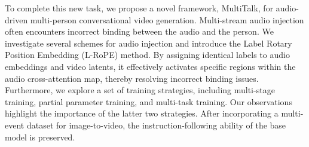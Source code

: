 \documentclass{article}
\begin{document}



To complete this new task, we propose a novel framework, MultiTalk, for audio-driven multi-person conversational video generation. Multi-stream audio injection often encounters incorrect binding between the audio and the person. We investigate several schemes for audio injection and introduce the Label Rotary Position Embedding (L-RoPE) method. By assigning identical labels to audio embeddings and video latents, it effectively activates specific regions within the audio cross-attention map, thereby resolving incorrect binding issues. Furthermore, we explore a set of training strategies, including multi-stage training, partial parameter training, and multi-task training. Our observations highlight the importance of the latter two strategies. After incorporating a multi-event dataset for image-to-video, the instruction-following ability of the base model is preserved.


\end{document}
